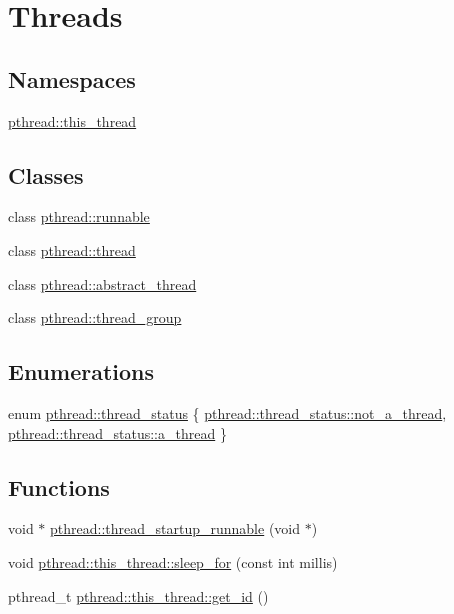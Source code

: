 \hypertarget{group__threads}{\section{Threads}
\label{group__threads}
}
\subsection*{Namespaces}
\begin{DoxyCompactItemize}
\item 
 \hyperlink{namespacepthread_1_1this__thread}{pthread\+::this\+\_\+thread}
\end{DoxyCompactItemize}
\subsection*{Classes}
\begin{DoxyCompactItemize}
\item 
class \hyperlink{classpthread_1_1runnable}{pthread\+::runnable}
\item 
class \hyperlink{classpthread_1_1thread}{pthread\+::thread}
\item 
class \hyperlink{classpthread_1_1abstract__thread}{pthread\+::abstract\+\_\+thread}
\item 
class \hyperlink{classpthread_1_1thread__group}{pthread\+::thread\+\_\+group}
\end{DoxyCompactItemize}
\subsection*{Enumerations}
\begin{DoxyCompactItemize}
\item 
enum \hyperlink{group__threads_gac4b6e78f3d72c946ace7a92f3bec4101}{pthread\+::thread\+\_\+status} \{ \hyperlink{group__threads_ggac4b6e78f3d72c946ace7a92f3bec4101a8414cd8c988083af4eabb1311df873cf}{pthread\+::thread\+\_\+status\+::not\+\_\+a\+\_\+thread}, 
\hyperlink{group__threads_ggac4b6e78f3d72c946ace7a92f3bec4101a13b3689524b86ca2caaee82399099df1}{pthread\+::thread\+\_\+status\+::a\+\_\+thread}
 \}
\end{DoxyCompactItemize}
\subsection*{Functions}
\begin{DoxyCompactItemize}
\item 
void $\ast$ \hyperlink{group__threads_ga4ca2138b7b0d82d63a05c708edd45a6f}{pthread\+::thread\+\_\+startup\+\_\+runnable} (void $\ast$)
\item 
void \hyperlink{group__threads_ga01ae1b738d3d2dbbfe966b4aad07a0a9}{pthread\+::this\+\_\+thread\+::sleep\+\_\+for} (const int millis)
\item 
pthread\+\_\+t \hyperlink{group__threads_ga57275c7fa3dd5591c7f19ccf451f1fb6}{pthread\+::this\+\_\+thread\+::get\+\_\+id} ()
\end{DoxyCompactItemize}


